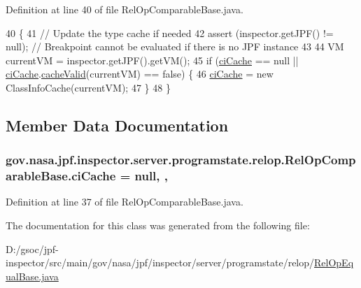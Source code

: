 Definition at line 40 of file Rel\+Op\+Comparable\+Base.\+java.


\begin{DoxyCode}
40                                                                \{
41     \textcolor{comment}{// Update the type cache if needed}
42     assert (inspector.getJPF() != null); \textcolor{comment}{// Breakpoint cannot be evaluated if there is no JPF instance}
43 
44     VM currentVM = inspector.getJPF().getVM();
45     \textcolor{keywordflow}{if} (\hyperlink{classgov_1_1nasa_1_1jpf_1_1inspector_1_1server_1_1programstate_1_1relop_1_1_rel_op_comparable_base_a3bd22b88a44dff54d68b1d8a3e8f3d0a}{ciCache} == null || \hyperlink{classgov_1_1nasa_1_1jpf_1_1inspector_1_1server_1_1programstate_1_1relop_1_1_rel_op_comparable_base_a3bd22b88a44dff54d68b1d8a3e8f3d0a}{ciCache}.\hyperlink{classgov_1_1nasa_1_1jpf_1_1inspector_1_1utils_1_1_class_info_cache_ac71fb1624b72457166c1326d44fb50c5}{cacheValid}(currentVM) == \textcolor{keyword}{false}) \{
46       \hyperlink{classgov_1_1nasa_1_1jpf_1_1inspector_1_1server_1_1programstate_1_1relop_1_1_rel_op_comparable_base_a3bd22b88a44dff54d68b1d8a3e8f3d0a}{ciCache} = \textcolor{keyword}{new} ClassInfoCache(currentVM);
47     \}
48   \}
\end{DoxyCode}


\subsection{Member Data Documentation}
\subsubsection[{\texorpdfstring{ci\+Cache}{ciCache}}]{ gov.\+nasa.\+jpf.\+inspector.\+server.\+programstate.\+relop.\+Rel\+Op\+Comparable\+Base.\+ci\+Cache = null\hspace{0.3cm}{\ttfamily [static]}, {\ttfamily [protected]}, {\ttfamily [inherited]}}\hypertarget{classgov_1_1nasa_1_1jpf_1_1inspector_1_1server_1_1programstate_1_1relop_1_1_rel_op_comparable_base_a3bd22b88a44dff54d68b1d8a3e8f3d0a}{}\label{classgov_1_1nasa_1_1jpf_1_1inspector_1_1server_1_1programstate_1_1relop_1_1_rel_op_comparable_base_a3bd22b88a44dff54d68b1d8a3e8f3d0a}


Definition at line 37 of file Rel\+Op\+Comparable\+Base.\+java.



The documentation for this class was generated from the following file\+:\begin{DoxyCompactItemize}
\item 
D\+:/gsoc/jpf-\/inspector/src/main/gov/nasa/jpf/inspector/server/programstate/relop/\hyperlink{_rel_op_equal_base_8java}{Rel\+Op\+Equal\+Base.\+java}\end{DoxyCompactItemize}
